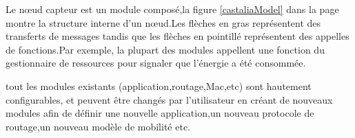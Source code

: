 Le nœud capteur est un module composé,la figure \ref{castaliaModel} dans la page \pageref{castaliaModel} montre la structure interne d'un nœud.Les flèches en gras représentent des transferts de messages tandis que les flèches en pointillé représentent des appelles de fonctions.Par exemple, la plupart des modules appellent une fonction du gestionnaire de ressources pour signaler que l'énergie a été consommée.

tout les modules existants (application,routage,Mac,etc) sont hautement configurables, et peuvent être changés par l'utilisateur en créant de nouveaux modules afin de définir une nouvelle application,un nouveau protocole de routage,un nouveau modèle de mobilité etc.
